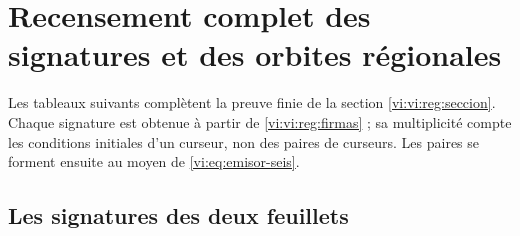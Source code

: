 \section{Recensement complet des signatures et des orbites régionales}
\label{vi:vi:reg:tablas}

Les tableaux suivants complètent la preuve finie de la section
\ref{vi:vi:reg:seccion}. Chaque signature est obtenue à partir de
\eqref{vi:vi:reg:firmas} ; sa multiplicité compte les conditions
initiales d’un curseur, non des paires de curseurs. Les paires se
forment ensuite au moyen de \eqref{vi:eq:emisor-seis}.

\subsection{Les signatures des deux feuillets}

